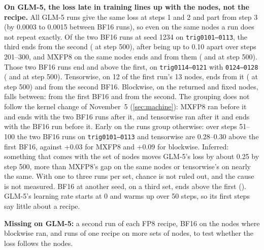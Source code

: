 \textbf{On GLM-5, the loss late in training lines up with the nodes, not the recipe.} All GLM-5 runs give the same loss at steps 1 and 2 and part from step 3 (by 0.0003 to 0.0015 between BF16 runs), so even on the same nodes a run does not repeat exactly. Of the two BF16 runs at seed 1234 on \texttt{trig0101--0113}, the third ends \TriLossGlmThirdRepLast{} from the second (\TriLossGlmThirdRepEnd{} at step 500), after being up to 0.10 apart over steps 201--300, and MXFP8 on the same nodes ends \TriLossGlmLast{} and \TriLossGlmMxThirdLast{} from them (\TriLossGlmEnd{} and \TriLossGlmMxThirdEnd{} at step 500). Those two BF16 runs end \TriLossGlmSameLast{} and \TriLossGlmThirdFirstLast{} above the first, on \texttt{trig0114--0121} with \texttt{0124--0128} (\TriLossGlmSameEnd{} and \TriLossGlmThirdFirstEnd{} at step 500). Tensorwise, on 12 of the first run's 13 nodes, ends \TriLossGlmTensorLast{} from it (\TriLossGlmTensorEnd{} at step 500) and \TriLossGlmTensorRep{} from the second BF16. Blockwise, on the returned and fixed nodes, falls between: \TriLossGlmBlockLast{} from the first BF16 and \TriLossGlmBlockRep{} from the second. The grouping does not follow the kernel change of November~5 (\cref{sec:machine}): MXFP8 ran before it and ends with the two BF16 runs after it, and tensorwise ran after it and ends with the BF16 run before it. Early on the runs group otherwise: over steps 51--100 the two BF16 runs on \texttt{trig0101--0113} and tensorwise are 0.28--0.30 above the first BF16, against +0.03 for MXFP8 and +0.09 for blockwise. Inferred: something that comes with the set of nodes moves GLM-5's loss by about 0.25 by step 500, more than MXFP8's gap on the same nodes or tensorwise's on nearly the same. With one to three runs per set, chance is not ruled out, and the cause is not measured. BF16 at another seed, on a third set, ends \TriLossGlmOtherLast{} above the first (\TriLossGlmOtherEnd). GLM-5's learning rate starts at 0 and warms up over 50 steps, so its first steps say little about a recipe.

\textbf{Missing on GLM-5:} a second run of each FP8 recipe, BF16 on the nodes where blockwise ran, and runs of one recipe on more sets of nodes, to test whether the loss follows the nodes.
